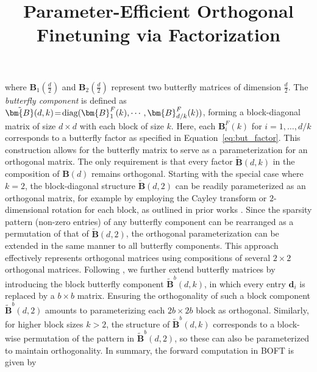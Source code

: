 \title{Parameter-Efficient Orthogonal Finetuning via Factorization}
where $\bm{B}_1(\frac{d}{2})$ and $\bm{B}_2(\frac{d}{2})$ represent two butterfly matrices of dimension $\frac{d}{2}$. The \emph{butterfly component} is defined as $\thickmuskip=2mu \medmuskip=2mu \tilde{\bm{B}}(d,k)=\text{diag}(\bm{B}^F_1(k),\cdots,\bm{B}^F_{d/k}(k))$, forming a block-diagonal matrix of size $d\times d$ with each block of size $k$. Here, each $\bm{B}^F_i(k)$ for $i=1,\dots,d/k$ corresponds to a butterfly factor as specified in Equation~\ref{eq:but_factor}. This construction allows for the butterfly matrix to serve as a parameterization for an orthogonal matrix. The only requirement is that every factor $\tilde{\bm{B}}(d,k)$ in the composition of $\bm{B}(d)$ remains orthogonal. Starting with the special case where $k=2$, the block-diagonal structure $\tilde{\bm{B}}(d,2)$ can be readily parameterized as an orthogonal matrix, for example by employing the Cayley transform or $2$-dimensional rotation for each block, as outlined in prior works \cite{liu2021orthogonal,qiu2023controlling}. Since the sparsity pattern (non-zero entries) of any butterfly component can be rearranged as a permutation of that of $\tilde{\bm{B}}(d,2)$, the orthogonal parameterization can be extended in the same manner to all butterfly components. This approach effectively represents orthogonal matrices using compositions of several $2\times 2$ orthogonal matrices. Following \cite{chen2022pixelated}, we further extend butterfly matrices by introducing the block butterfly component $\tilde{\bm{B}}^b(d,k)$, in which every entry $\bm{d}_i$ is replaced by a $b\times b$ matrix. Ensuring the orthogonality of such a block component $\tilde{\bm{B}}^b(d,2)$ amounts to parameterizing each $2b\times 2b$ block as orthogonal. Similarly, for higher block sizes $k>2$, the structure of $\tilde{\bm{B}}^b(d,k)$ corresponds to a block-wise permutation of the pattern in $\tilde{\bm{B}}^b(d,2)$, so these can also be parameterized to maintain orthogonality. In summary, the forward computation in BOFT is given by

